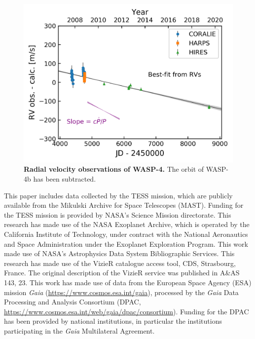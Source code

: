 \documentclass[RNAAS]{aastex62}
\begin{document}
\begin{figure}
    \begin{center}
		\includegraphics{20190716_rv_fit.png}
    \end{center}
    \vspace{-0.8cm}
    \caption{
      {\bf Radial velocity observations of WASP-4.}
      The orbit of WASP-4b has been subtracted.
       \label{fig:rv_o_minus_c}
    }
\end{figure}


\acknowledgements

%
This paper includes data collected by the TESS mission, which are
publicly available from the Mikulski Archive for Space Telescopes
(MAST).
%
Funding for the TESS mission is provided by NASA's Science Mission
directorate.
%
This research has made use of the NASA Exoplanet Archive, which is
operated by the California Institute of Technology, under contract
with the National Aeronautics and Space Administration under the
Exoplanet Exploration Program.
%
This work made use of NASA's Astrophysics Data System Bibliographic
Services.
%
This research has made use of the VizieR catalogue access tool, CDS,
Strasbourg, France. The original description of the VizieR service was
published in A\&AS 143, 23.
%
This work has made use of data from the European Space Agency (ESA)
mission {\it Gaia} (\url{https://www.cosmos.esa.int/gaia}), processed
by the {\it Gaia} Data Processing and Analysis Consortium (DPAC,
\url{https://www.cosmos.esa.int/web/gaia/dpac/consortium}). Funding
for the DPAC has been provided by national institutions, in particular
the institutions participating in the {\it Gaia} Multilateral
Agreement.
%
\newline
%

                            
 
\end{document}
